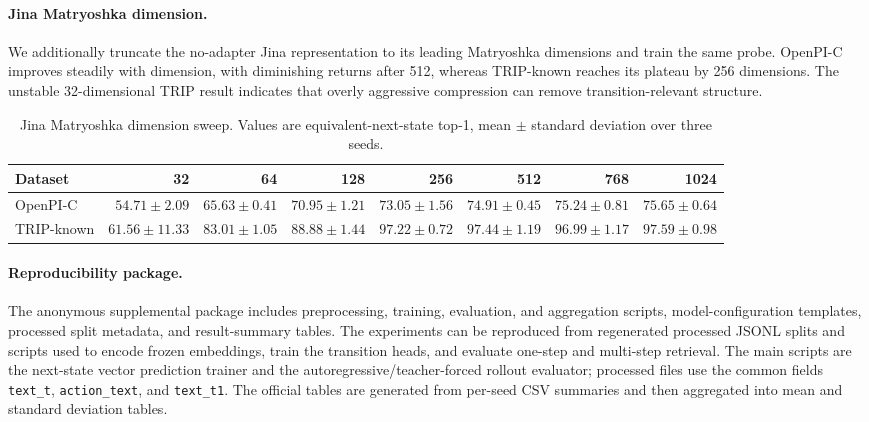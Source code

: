 \documentclass{article}
\begin{document}
\paragraph{Jina Matryoshka dimension.}
We additionally truncate the no-adapter Jina representation to its leading Matryoshka dimensions and train the same probe. OpenPI-C improves steadily with dimension, with diminishing returns after 512, whereas TRIP-known reaches its plateau by 256 dimensions. The unstable 32-dimensional TRIP result indicates that overly aggressive compression can remove transition-relevant structure.

\begin{table}[H]
  \centering
  \caption{Jina Matryoshka dimension sweep. Values are equivalent-next-state top-1, mean $\pm$ standard deviation over three seeds.}
  \label{tab:jina-dimension}
  \footnotesize
  \setlength{\tabcolsep}{2pt}
  \begin{tabular}{lrrrrrrr}
    \toprule
    Dataset & 32 & 64 & 128 & 256 & 512 & 768 & 1024 \\
    \midrule
    OpenPI-C & $54.71{\pm}2.09$ & $65.63{\pm}0.41$ & $70.95{\pm}1.21$ & $73.05{\pm}1.56$ & $74.91{\pm}0.45$ & $75.24{\pm}0.81$ & $75.65{\pm}0.64$ \\
    TRIP-known & $61.56{\pm}11.33$ & $83.01{\pm}1.05$ & $88.88{\pm}1.44$ & $97.22{\pm}0.72$ & $97.44{\pm}1.19$ & $96.99{\pm}1.17$ & $97.59{\pm}0.98$ \\
    \bottomrule
  \end{tabular}
\end{table}

\paragraph{Reproducibility package.}
The anonymous supplemental package includes preprocessing, training, evaluation, and aggregation scripts, model-configuration templates, processed split metadata, and result-summary tables. The experiments can be reproduced from regenerated processed JSONL splits and scripts used to encode frozen embeddings, train the transition heads, and evaluate one-step and multi-step retrieval. The main scripts are the next-state vector prediction trainer and the autoregressive/teacher-forced rollout evaluator; processed files use the common fields \texttt{text\_t}, \texttt{action\_text}, and \texttt{text\_t1}. The official tables are generated from per-seed CSV summaries and then aggregated into mean and standard deviation tables.
\end{document}
